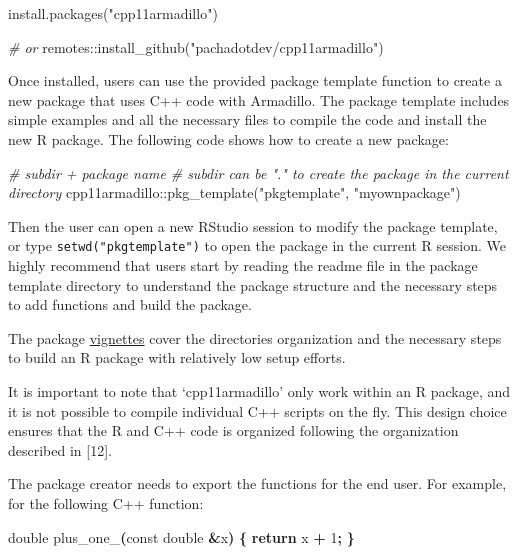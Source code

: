 \documentclass[preprint,12pt, a4paper]{elsarticle}
\newenvironment{Shaded}{\begin{snugshade}}{\end{snugshade}}
\newcommand{\AttributeTok}[1]{\textcolor[rgb]{0.77,0.63,0.00}{#1}}
\newcommand{\CommentTok}[1]{\textcolor[rgb]{0.56,0.35,0.01}{\textit{#1}}}
\newcommand{\ControlFlowTok}[1]{\textcolor[rgb]{0.13,0.29,0.53}{\textbf{#1}}}
\newcommand{\DataTypeTok}[1]{\textcolor[rgb]{0.13,0.29,0.53}{#1}}
\newcommand{\DecValTok}[1]{\textcolor[rgb]{0.00,0.00,0.81}{#1}}
\newcommand{\FunctionTok}[1]{\textcolor[rgb]{0.00,0.00,0.00}{#1}}
\newcommand{\NormalTok}[1]{#1}
\newcommand{\OperatorTok}[1]{\textcolor[rgb]{0.81,0.36,0.00}{\textbf{#1}}}
\newcommand{\SpecialCharTok}[1]{\textcolor[rgb]{0.00,0.00,0.00}{#1}}
\newcommand{\StringTok}[1]{\textcolor[rgb]{0.31,0.60,0.02}{#1}}
\newcommand{\VariableTok}[1]{\textcolor[rgb]{0.00,0.00,0.00}{#1}}
\begin{document}
\begin{Shaded}
\begin{Highlighting}[]
\FunctionTok{install.packages}\NormalTok{(}\StringTok{"cpp11armadillo"}\NormalTok{)}

\CommentTok{\# or}
\NormalTok{remotes}\SpecialCharTok{::}\FunctionTok{install\_github}\NormalTok{(}\StringTok{"pachadotdev/cpp11armadillo"}\NormalTok{)}
\end{Highlighting}
\end{Shaded}

Once installed, users can use the provided package template function to
create a new package that uses C++ code with Armadillo. The package
template includes simple examples and all the necessary files to compile
the code and install the new R package. The following code shows how to
create a new package:

\begin{Shaded}
\begin{Highlighting}[]
\CommentTok{\# subdir + package name}
\CommentTok{\# subdir can be "." to create the package in the current directory}
\NormalTok{cpp11armadillo}\SpecialCharTok{::}\FunctionTok{pkg\_template}\NormalTok{(}\StringTok{"pkgtemplate"}\NormalTok{, }\StringTok{"myownpackage"}\NormalTok{)}
\end{Highlighting}
\end{Shaded}

Then the user can open a new RStudio session to modify the package
template, or type \texttt{setwd("pkgtemplate")} to open the package in
the current R session. We highly recommend that users start by reading
the readme file in the package template directory to understand the
package structure and the necessary steps to add functions and build the
package.

The package
\href{https://pacha.dev/cpp11armadillo/index.html}{vignettes} cover the
directories organization and the necessary steps to build an R package
with relatively low setup efforts.

It is important to note that `cpp11armadillo' only work within an R
package, and it is not possible to compile individual C++ scripts on the
fly. This design choice ensures that the R and C++ code is organized
following the organization described in {[}12{]}.

The package creator needs to export the functions for the end user. For
example, for the following C++ function:

\begin{Shaded}
\begin{Highlighting}[]
\DataTypeTok{double} \VariableTok{plus\_one\_}\OperatorTok{(}\AttributeTok{const} \DataTypeTok{double} \OperatorTok{\&}\NormalTok{x}\OperatorTok{)} \OperatorTok{\{}
  \ControlFlowTok{return}\NormalTok{ x }\OperatorTok{+} \DecValTok{1}\OperatorTok{;}
\OperatorTok{\}}
\end{Highlighting}
\end{Shaded}
\end{document}
